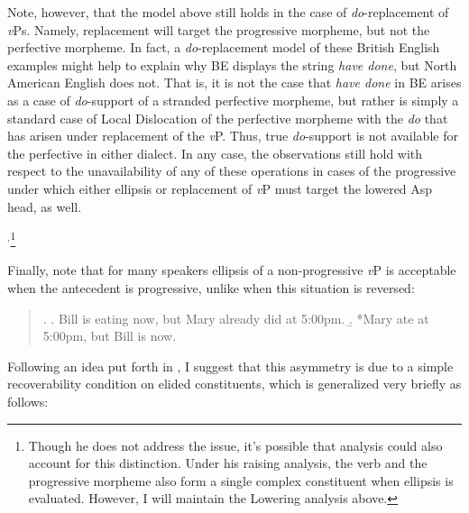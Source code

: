 {\begin{quote}
\end{quote}
Note, however, that the model above still holds in the case of {\it do}-replacement of {\it v}Ps. Namely, replacement will target the progressive morpheme, but not the perfective morpheme. In fact, a {\it do}-replacement model of these British English examples might help to explain why BE displays the string {\it have done}, but North American English does not. That is, it is not the case that {\it have done} in BE arises as a case of {\it do}-support of a stranded perfective morpheme, but rather is simply a standard case of Local Dislocation of the perfective morpheme with the {\it do} that has arisen under replacement of the {\it v}P. Thus, true {\it do}-support is not available for the perfective in either dialect. In any case, the observations still hold with respect to the unavailability of any of these operations in cases of the progressive under which either ellipsis or replacement of {\it v}P must target the lowered Asp head, as well.}$^{,}$\footnote{Though he does not address the issue, it's possible that  analysis could also account for this distinction. Under his raising analysis, the verb and the progressive morpheme also form a single complex constituent when ellipsis is evaluated. However, I will maintain the Lowering analysis above.}

Finally, note that for many speakers ellipsis of a non-progressive {\it v}P is acceptable when the antecedent is progressive, unlike when this situation is reversed:

\singlespacing
\begin{quote}
\ex.
\a. Bill is eating now, but Mary already did at 5:00pm.
\b. *Mary ate at 5:00pm, but Bill is now.

\end{quote}
\onehalfspacing
Following an idea put forth in \citet{potsdam1997}, I suggest that this asymmetry is due to a simple recoverability condition on elided constituents, which is generalized very briefly as follows:

